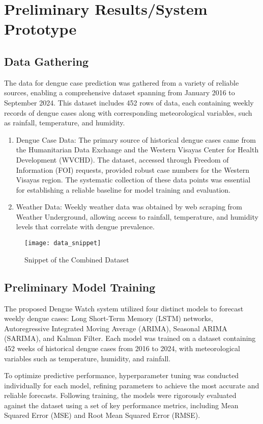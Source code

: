 \chapter{Preliminary Results/System Prototype}
\section{Data Gathering}
The data for dengue case prediction was gathered from a variety of reliable sources, enabling a comprehensive dataset spanning from January 2016 to September 2024. This dataset includes 452 rows of data, each containing weekly records of dengue cases along with corresponding meteorological variables, such as rainfall, temperature, and humidity.
\begin{enumerate}
	\item Dengue Case Data: The primary source of historical dengue cases came from the Humanitarian Data Exchange and the Western Visayas Center for Health Development (WVCHD). The dataset, accessed through Freedom of Information (FOI) requests, provided robust case numbers for the Western Visayas region. The systematic collection of these data points was essential for establishing a reliable baseline for model training and evaluation.
	\item Weather Data: Weekly weather data was obtained by web scraping from Weather Underground, allowing access to rainfall, temperature, and humidity levels that correlate with dengue prevalence.
\end{enumerate}

\begin{figure}[ht]
	\centering
	\texttt{[image: data\_snippet]}
	\caption{Snippet of the Combined Dataset}
	\label{fig:data_snippet}
\end{figure}

\section{Preliminary Model Training}
The proposed Dengue Watch system utilized four distinct models to forecast weekly dengue cases: Long Short-Term Memory (LSTM) networks, Autoregressive Integrated Moving Average (ARIMA), Seasonal ARIMA (SARIMA), and Kalman Filter. Each model was trained on a dataset containing 452 weeks of historical dengue cases from 2016 to 2024, with meteorological variables such as temperature, humidity, and rainfall.

To optimize predictive performance, hyperparameter tuning was conducted individually for each model, refining parameters to achieve the most accurate and reliable forecasts. Following training, the models were rigorously evaluated against the dataset using a set of key performance metrics, including Mean Squared Error (MSE) and Root Mean Squared Error (RMSE).

